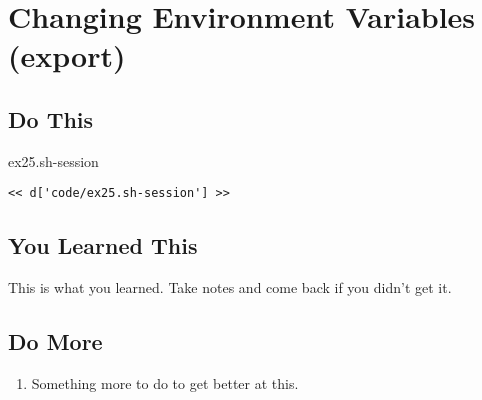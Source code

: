 \chapter{Changing Environment Variables (export)}

\section{Do This}

\begin{code}{ex25.sh-session}
\begin{Verbatim}
<< d['code/ex25.sh-session'] >>
\end{Verbatim}
\end{code}


\section{You Learned This}

This is what you learned.  Take notes and come back if you didn't get it.

\section{Do More}

\begin{enumerate}
\item Something more to do to get better at this.
\end{enumerate}

